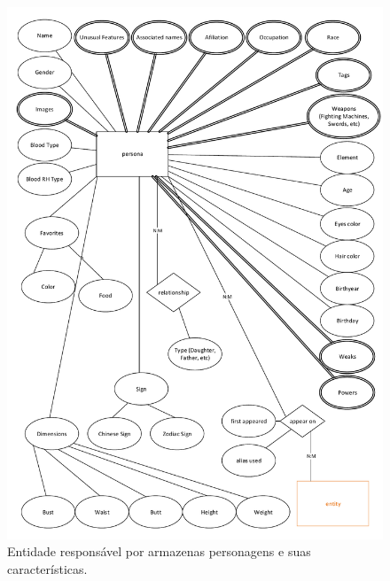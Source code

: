 \documentclass[12pt]{article}
\begin{document}
\begin{figure}[H]
\centering
\includegraphics[width=1\textwidth]{MER_-_Persona.pdf}
\caption{Entidade responsável por armazenas personagens e suas características.} \label{Persona}
\end{figure}
\end{document}
